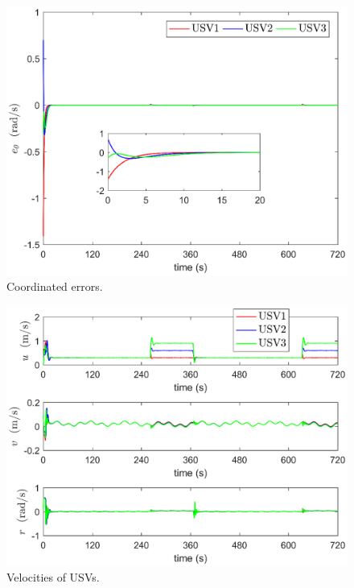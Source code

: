 \documentclass[english]{cccconf}
\begin{document}
\begin{figure}[!htb]
	\centering
	\includegraphics[width=\hsize]{coordinated_errors.eps}
	\caption{Coordinated errors.}
	\label{coordinated errors}
\end{figure}

\begin{figure}[!htb]
	\centering
	\includegraphics[width=\hsize]{velocities.eps}
	\caption{Velocities of USVs.}
	\label{velocities}
\end{figure}
\end{document}
